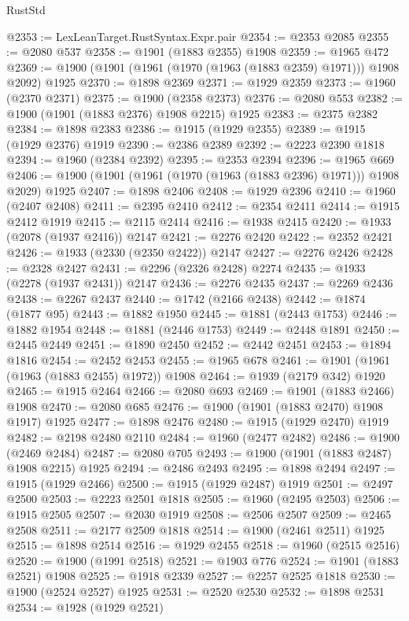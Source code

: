 \begin{lexlean}{RustStd}
\begin{coremodule}
{\begin{coremodule}
{{{{{{{{{{{{{{{{{{{{{{{{{{{{{{{{{{{{{{{{{{{@2353 := LexLeanTarget.RustSyntax.Expr.pair
@2354 := @2353 @2085
@2355 := @2080 @537
@2358 := @1901 (@1883 @2355) @1908
@2359 := @1965 @472
@2369 := @1900 (@1901 (@1961 (@1970 (@1963 (@1883 @2359) @1971))) @1908 @2092) @1925
@2370 := @1898 @2369
@2371 := @1929 @2359
@2373 := @1960 (@2370 @2371)
@2375 := @1900 (@2358 @2373)
@2376 := @2080 @553
@2382 := @1900 (@1901 (@1883 @2376) @1908 @2215) @1925
@2383 := @2375 @2382
@2384 := @1898 @2383
@2386 := @1915 (@1929 @2355)
@2389 := @1915 (@1929 @2376) @1919
@2390 := @2386 @2389
@2392 := @2223 @2390 @1818
@2394 := @1960 (@2384 @2392)
@2395 := @2353 @2394
@2396 := @1965 @669
@2406 := @1900 (@1901 (@1961 (@1970 (@1963 (@1883 @2396) @1971))) @1908 @2029) @1925
@2407 := @1898 @2406
@2408 := @1929 @2396
@2410 := @1960 (@2407 @2408)
@2411 := @2395 @2410
@2412 := @2354 @2411
@2414 := @1915 @2412 @1919
@2415 := @2115 @2414
@2416 := @1938 @2415
@2420 := @1933 (@2078 (@1937 @2416)) @2147
@2421 := @2276 @2420
@2422 := @2352 @2421
@2426 := @1933 (@2330 (@2350 @2422)) @2147
@2427 := @2276 @2426
@2428 := @2328 @2427
@2431 := @2296 (@2326 @2428) @2274
@2435 := @1933 (@2278 (@1937 @2431)) @2147
@2436 := @2276 @2435
@2437 := @2269 @2436
@2438 := @2267 @2437
@2440 := @1742 (@2166 @2438)
@2442 := @1874 (@1877 @95)
@2443 := @1882 @1950
@2445 := @1881 (@2443 @1753)
@2446 := @1882 @1954
@2448 := @1881 (@2446 @1753)
@2449 := @2448 @1891
@2450 := @2445 @2449
@2451 := @1890 @2450
@2452 := @2442 @2451
@2453 := @1894 @1816
@2454 := @2452 @2453
@2455 := @1965 @678
@2461 := @1901 (@1961 (@1963 (@1883 @2455) @1972)) @1908
@2464 := @1939 (@2179 @342) @1920
@2465 := @1915 @2464
@2466 := @2080 @693
@2469 := @1901 (@1883 @2466) @1908
@2470 := @2080 @685
@2476 := @1900 (@1901 (@1883 @2470) @1908 @1917) @1925
@2477 := @1898 @2476
@2480 := @1915 (@1929 @2470) @1919
@2482 := @2198 @2480 @2110
@2484 := @1960 (@2477 @2482)
@2486 := @1900 (@2469 @2484)
@2487 := @2080 @705
@2493 := @1900 (@1901 (@1883 @2487) @1908 @2215) @1925
@2494 := @2486 @2493
@2495 := @1898 @2494
@2497 := @1915 (@1929 @2466)
@2500 := @1915 (@1929 @2487) @1919
@2501 := @2497 @2500
@2503 := @2223 @2501 @1818
@2505 := @1960 (@2495 @2503)
@2506 := @1915 @2505
@2507 := @2030 @1919
@2508 := @2506 @2507
@2509 := @2465 @2508
@2511 := @2177 @2509 @1818
@2514 := @1900 (@2461 @2511) @1925
@2515 := @1898 @2514
@2516 := @1929 @2455
@2518 := @1960 (@2515 @2516)
@2520 := @1900 (@1991 @2518)
@2521 := @1903 @776
@2524 := @1901 (@1883 @2521) @1908
@2525 := @1918 @2339
@2527 := @2257 @2525 @1818
@2530 := @1900 (@2524 @2527) @1925
@2531 := @2520 @2530
@2532 := @1898 @2531
@2534 := @1928 (@1929 @2521)
}}}}}}}}}}}}}}}}}}}}}}}}}}}}}}}}}}}}}}}}}}}
\end{coremodule}}
\end{coremodule}
\end{lexlean}
